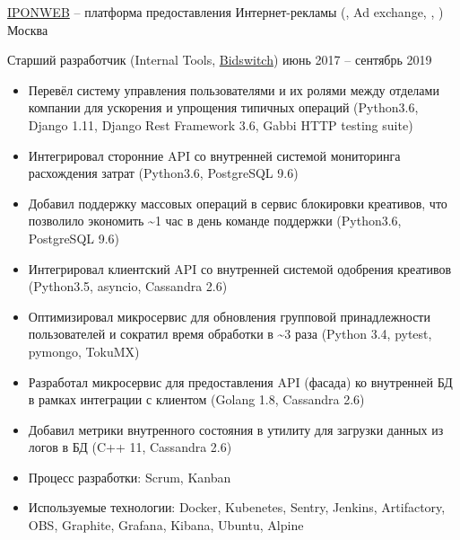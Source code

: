 \documentclass[unicode, 10pt, a4paper, oneside, fleqn]{article}
\begin{document}
\job  %
    {\href{http://www.iponweb.com}{IPONWEB} -- платформа предоставления
     Интернет-рекламы (, Ad exchange, , )}
    {Москва}
    {
        \position  %
            {Старший разработчик (Internal Tools, \href{http://www.bidswitch.com/}{Bidswitch})}
            {июнь 2017 -- сентябрь 2019}
            {
                \begin{itemize}
                    \item{Перевёл систему управления пользователями и их ролями
                          между отделами компании для ускорения и упрощения
                          типичных операций (Python3.6, Django 1.11, Django Rest
                          Framework 3.6, Gabbi HTTP testing suite)}
                    \item{Интегрировал сторонние API со внутренней системой
                          мониторинга расхождения затрат (Python3.6, PostgreSQL 9.6)}
                    \item{Добавил поддержку массовых операций в сервис блокировки
                          креативов, что позволило экономить \textasciitilde{}1 час в день
                          команде поддержки (Python3.6, PostgreSQL 9.6)}
                    \item{Интегрировал клиентский API со внутренней системой
                          одобрения креативов (Python3.5, asyncio, Cassandra 2.6)}
                    \item{Оптимизировал микросервис для обновления групповой
                          принадлежности пользователей и сократил время обработки
                          в \textasciitilde{}3 раза (Python 3.4, pytest, pymongo, TokuMX)}
                    \item{Разработал микросервис для предоставления API (фасада) ко
                          внутренней БД в рамках интеграции с клиентом
                          (Golang 1.8, Cassandra 2.6)}
                    \item{Добавил метрики внутренного состояния в утилиту для
                          загрузки данных из логов в БД (C++ 11, Cassandra 2.6)}
                    \item{Процесс разработки: Scrum, Kanban}
                    \item{Используемые технологии: Docker, Kubenetes, Sentry, Jenkins,
                          Artifactory, OBS, Graphite, Grafana, Kibana, Ubuntu, Alpine}

\end{itemize}}}
\end{document}
